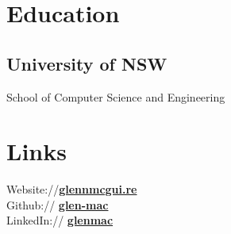 \documentclass[letterpaper]{deedy-resume} %
\begin{document}
\begin{minipage}[t]{0.33\textwidth} %


\section{Education} 
\sectionspace %
\subsection{University of NSW}
\sectionspace %
School of Computer Science and Engineering \\

\sectionspace %
\sectionspace %

%
%


%


\section{Links} 
\sectionspace %
Website://\href{http://glennmcgui.re}{\bf glennmcgui.re} \\
Github:// \href{https://github.com/glen-mac}{\bf glen-mac} \\
LinkedIn:// \href{https://au.linkedin.com/in/glenmac}{\bf glenmac} \\


\end{minipage}
\end{document}
